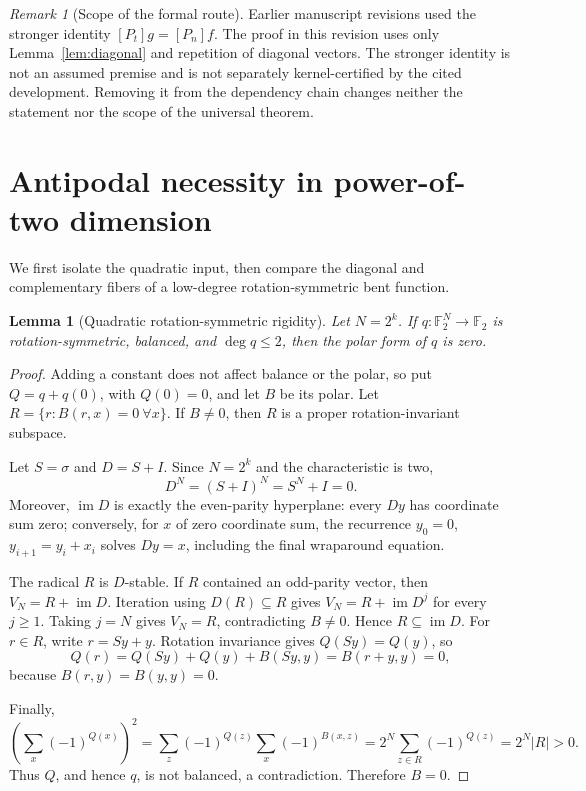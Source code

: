 \documentclass[11pt,a4paper]{article}
\newtheorem{lemma}[theorem]{Lemma}
\theoremstyle{remark}
\newtheorem{remark}[theorem]{Remark}
\theoremstyle{plain}
\newcommand{\F}{\mathbb F_2}
\begin{document}
\begin{remark}[Scope of the formal route]
Earlier manuscript revisions used the stronger identity $[P_t]g=[P_n]f$. The proof in this revision uses only Lemma~\ref{lem:diagonal} and repetition of diagonal vectors. The stronger identity is not an assumed premise and is not separately kernel-certified by the cited development. Removing it from the dependency chain changes neither the statement nor the scope of the universal theorem.
\end{remark}

\section{Antipodal necessity in power-of-two dimension}

We first isolate the quadratic input, then compare the diagonal and complementary fibers of a low-degree rotation-symmetric bent function.

\begin{lemma}[Quadratic rotation-symmetric rigidity]\label{lem:quad-rigidity}
Let \(N=2^k\). If \(q:\F^N\to\F\) is rotation-symmetric, balanced, and \(\deg q\le2\), then the polar form of \(q\) is zero.
\end{lemma}
\begin{proof}
Adding a constant does not affect balance or the polar, so put \(Q=q+q(0)\), with \(Q(0)=0\), and let \(B\) be its polar. Let \(R=\{r:B(r,x)=0\ \forall x\}\). If \(B\ne0\), then \(R\) is a proper rotation-invariant subspace.

Let $S=\sigma$ and $D=S+I$. Since $N=2^k$ and the characteristic is two,
\[
D^N=(S+I)^N=S^N+I=0.
\]
Moreover, $\operatorname{im}D$ is exactly the even-parity hyperplane: every $Dy$ has coordinate sum zero; conversely, for $x$ of zero coordinate sum, the recurrence $y_0=0$, $y_{i+1}=y_i+x_i$ solves $Dy=x$, including the final wraparound equation.

The radical $R$ is $D$-stable. If $R$ contained an odd-parity vector, then $V_N=R+\operatorname{im}D$. Iteration using $D(R)\subseteq R$ gives $V_N=R+\operatorname{im}D^j$ for every $j\ge1$. Taking $j=N$ gives $V_N=R$, contradicting $B\ne0$. Hence $R\subseteq\operatorname{im}D$.
For \(r\in R\), write \(r=Sy+y\). Rotation invariance gives \(Q(Sy)=Q(y)\), so
\[
Q(r)=Q(Sy)+Q(y)+B(Sy,y)=B(r+y,y)=0,
\]
because \(B(r,y)=B(y,y)=0\).

Finally,
\[
\left(\sum_x(-1)^{Q(x)}\right)^2
=\sum_{z}(-1)^{Q(z)}\sum_x(-1)^{B(x,z)}
=2^N\sum_{z\in R}(-1)^{Q(z)}
=2^N|R|>0.
\]
Thus \(Q\), and hence \(q\), is not balanced, a contradiction. Therefore \(B=0\).
\end{proof}
\end{document}

